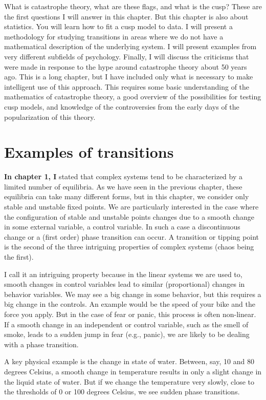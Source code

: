 \documentclass[
  letterpaper,
]{scrbook}
\begin{document}
What is catastrophe theory, what are these flags, and what is the cusp?
These are the first questions I will answer in this chapter. But this
chapter is also about statistics. You will learn how to fit a cusp model
to data. I will present a methodology for studying transitions in areas
where we do not have a mathematical description of the underlying
system. I will present examples from very different subfields of
psychology. Finally, I will discuss the criticisms that were made in
response to the hype around catastrophe theory about 50 years ago. This
is a long chapter, but I have included only what is necessary to make
intelligent use of this approach. This requires some basic understanding
of the mathematics of catastrophe theory, a good overview of the
possibilities for testing cusp models, and knowledge of the
controversies from the early days of the popularization of this theory.

\hypertarget{examples-of-transitions}{%
\section{Examples of transitions}\label{examples-of-transitions}}

\textbf{In chapter 1, I} stated that complex systems tend to be
characterized by a limited number of equilibria. As we have seen in the
previous chapter, these equilibria can take many different forms, but in
this chapter, we consider only stable and unstable fixed points. We are
particularly interested in the case where the configuration of stable
and unstable points changes due to a smooth change in some external
variable, a control variable. In such a case a discontinuous change or a
(first order) phase transition can occur. A transition or tipping point
is the second of the three intriguing properties of complex systems
(chaos being the first).

I call it an intriguing property because in the linear systems we are
used to, smooth changes in control variables lead to similar
(proportional) changes in behavior variables. We may see a big change in
some behavior, but this requires a big change in the controls. An
example would be the speed of your bike and the force you apply. But in
the case of fear or panic, this process is often non-linear. If a smooth
change in an independent or control variable, such as the smell of
smoke, leads to a sudden jump in fear (e.g., panic), we are likely to be
dealing with a phase transition.

A key physical example is the change in state of water. Between, say, 10
and 80 degrees Celsius, a smooth change in temperature results in only a
slight change in the liquid state of water. But if we change the
temperature very slowly, close to the thresholds of 0 or 100 degrees
Celsius, we see sudden phase transitions.
\end{document}
